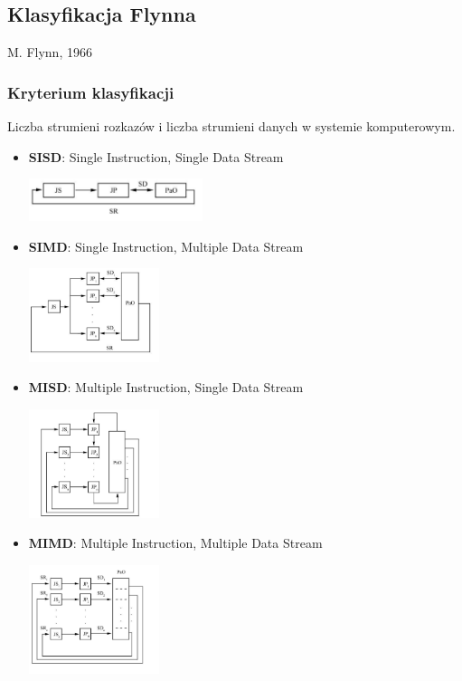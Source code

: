 \documentclass[a4paper,twoside]{article}
\begin{document}
\subsection{Klasyfikacja Flynna}
\begin{samepage}
	M. Flynn, 1966
	\subsubsection{Kryterium klasyfikacji}
	Liczba strumieni rozkazów i liczba strumieni danych w systemie komputerowym.
	
	\begin{itemize}
		\item \textbf{SISD}: Single Instruction, Single Data Stream
		\begin{center}
			\includegraphics[width=0.4\textwidth]{./images/Flynn01}
		\end{center}
		\item \textbf{SIMD}: Single Instruction, Multiple Data Stream
		\begin{center}
			\includegraphics[width=0.3\textwidth]{./images/Flynn02}
		\end{center}
		\item \textbf{MISD}: Multiple Instruction, Single Data Stream
		\begin{center}
			\includegraphics[width=0.3\textwidth]{./images/Flynn03}
		\end{center}
		\item \textbf{MIMD}: Multiple Instruction, Multiple Data Stream
		\begin{center}
			\includegraphics[width=0.3\textwidth]{./images/Flynn04}

\end{center}
\end{itemize}
\end{samepage}
\end{document}
